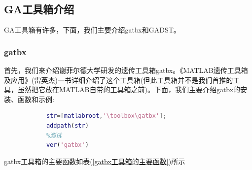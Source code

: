     \subsection{GA工具箱介绍}
        \par
        GA工具箱有许多，下面，我们主要介绍gatbx和GADST。
        \subsubsection{gatbx}
            \par
            首先，我们来介绍谢菲尔德大学研发的遗传工具箱gatbx。《MATLAB遗传工具箱及应用》(雷英杰)一书详细介绍了这个工具箱(但此工具箱并不是我们首推的工具，虽然把它放在MATLAB自带的工具箱之前)。下面，我们主要介绍gatbx的安装、函数和示例:
            \begin{lstlisting}[language = Matlab]
            %安装：将gatbx解压到str后再运行下面的命令
            str=[matlabroot,'\toolbox\gatbx'];
            addpath(str)
            %测试
            ver('gatbx')
            \end{lstlisting}
            \par
            gatbx工具箱的主要函数如表(\ref{gatbx工具箱的主要函数})所示
